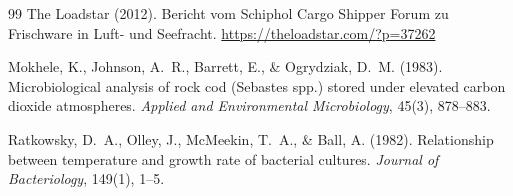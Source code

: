 \documentclass[a4paper, 12pt, twoside, openright]{report}
\theoremstyle{definition}
\theoremstyle{definition}
\begin{document}
\begin{thebibliography}{99}
The Loadstar (2012).
\newblock Bericht vom Schiphol Cargo Shipper Forum zu Frischware in Luft- und Seefracht.
\newblock \url{https://theloadstar.com/?p=37262}

Mokhele, K., Johnson, A.~R., Barrett, E., \& Ogrydziak, D.~M. (1983).
\newblock Microbiological analysis of rock cod (Sebastes spp.) stored under elevated carbon dioxide atmospheres.
\newblock \emph{Applied and Environmental Microbiology}, 45(3), 878--883.

Ratkowsky, D.~A., Olley, J., McMeekin, T.~A., \& Ball, A. (1982).
\newblock Relationship between temperature and growth rate of bacterial cultures.
\newblock \emph{Journal of Bacteriology}, 149(1), 1--5.

\end{thebibliography}

\cleardoublepage
\end{document}
